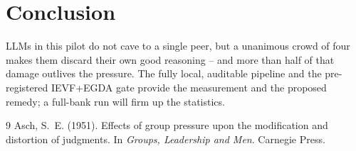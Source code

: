 \documentclass[11pt,a4paper]{article}
\begin{document}
\section{Conclusion}
LLMs in this pilot do not cave to a single peer, but a unanimous crowd of
four makes them discard their own good reasoning -- and more than half of
that damage outlives the pressure. The fully local, auditable pipeline
and the pre-registered IEVF+EGDA gate provide the measurement and the
proposed remedy; a full-bank run will firm up the statistics.

\begin{thebibliography}{9}
 Asch, S.~E. (1951). Effects of group pressure upon the
modification and distortion of judgments. In \emph{Groups, Leadership and
Men}. Carnegie Press.
\end{thebibliography}
\end{document}
